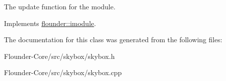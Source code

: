 The update function for the module. 



Implements \hyperlink{classflounder_1_1imodule_a9a53d48a46b5f6b16a92b2cd8503f74a}{flounder\+::imodule}.



The documentation for this class was generated from the following files\+:\begin{DoxyCompactItemize}
\item 
Flounder-\/\+Core/src/skybox/skybox.\+h\item 
Flounder-\/\+Core/src/skybox/skybox.\+cpp\end{DoxyCompactItemize}
